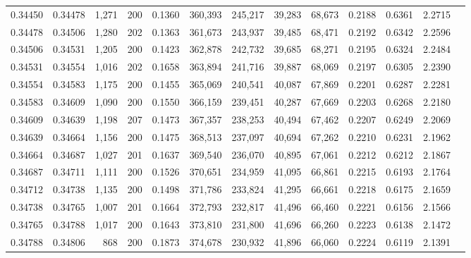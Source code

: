 \begin{tabular}{rrrrrrrrrrrrr}
0.34450 & 0.34478 & 1,271 & 200 &                                     0.1360 & 360,393 & 245,217 &  39,283 &  68,673 & 0.2188 & 0.6361 & 2.2715 \\
0.34478 & 0.34506 & 1,280 & 202 &                                     0.1363 & 361,673 & 243,937 &  39,485 &  68,471 & 0.2192 & 0.6342 & 2.2596 \\
0.34506 & 0.34531 & 1,205 & 200 &                                     0.1423 & 362,878 & 242,732 &  39,685 &  68,271 & 0.2195 & 0.6324 & 2.2484 \\
0.34531 & 0.34554 & 1,016 & 202 &                                     0.1658 & 363,894 & 241,716 &  39,887 &  68,069 & 0.2197 & 0.6305 & 2.2390 \\
0.34554 & 0.34583 & 1,175 & 200 &                                     0.1455 & 365,069 & 240,541 &  40,087 &  67,869 & 0.2201 & 0.6287 & 2.2281 \\
0.34583 & 0.34609 & 1,090 & 200 &                                     0.1550 & 366,159 & 239,451 &  40,287 &  67,669 & 0.2203 & 0.6268 & 2.2180 \\
0.34609 & 0.34639 & 1,198 & 207 &                                     0.1473 & 367,357 & 238,253 &  40,494 &  67,462 & 0.2207 & 0.6249 & 2.2069 \\
0.34639 & 0.34664 & 1,156 & 200 &                                     0.1475 & 368,513 & 237,097 &  40,694 &  67,262 & 0.2210 & 0.6231 & 2.1962 \\
0.34664 & 0.34687 & 1,027 & 201 &                                     0.1637 & 369,540 & 236,070 &  40,895 &  67,061 & 0.2212 & 0.6212 & 2.1867 \\
0.34687 & 0.34711 & 1,111 & 200 &                                     0.1526 & 370,651 & 234,959 &  41,095 &  66,861 & 0.2215 & 0.6193 & 2.1764 \\
0.34712 & 0.34738 & 1,135 & 200 &                                     0.1498 & 371,786 & 233,824 &  41,295 &  66,661 & 0.2218 & 0.6175 & 2.1659 \\
0.34738 & 0.34765 & 1,007 & 201 &                                     0.1664 & 372,793 & 232,817 &  41,496 &  66,460 & 0.2221 & 0.6156 & 2.1566 \\
0.34765 & 0.34788 & 1,017 & 200 &                                     0.1643 & 373,810 & 231,800 &  41,696 &  66,260 & 0.2223 & 0.6138 & 2.1472 \\
0.34788 & 0.34806 &   868 & 200 &                                     0.1873 & 374,678 & 230,932 &  41,896 &  66,060 & 0.2224 & 0.6119 & 2.1391 \\

\end{tabular}
